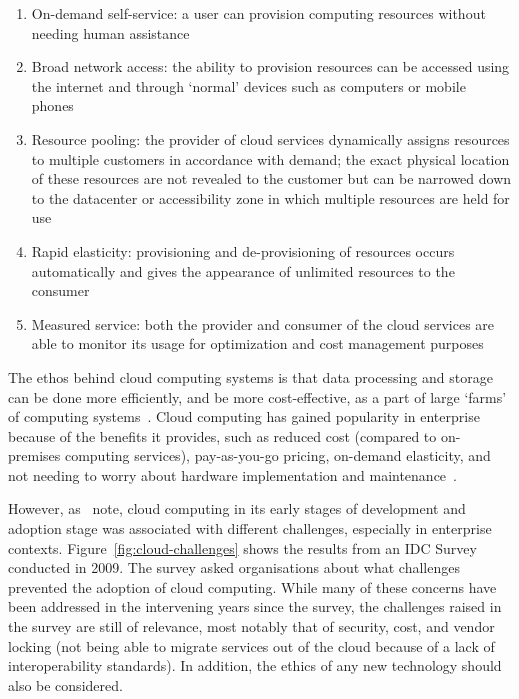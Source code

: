\begin{enumerate}
    \item On-demand self-service: a user can provision computing resources without needing human assistance
    \item Broad network access: the ability to provision resources can be accessed using the internet and through `normal' devices such as computers or mobile phones
    \item Resource pooling: the provider of cloud services dynamically assigns resources to multiple customers in accordance with demand; the exact physical location of these resources are not revealed to the customer but can be narrowed down to the datacenter or accessibility zone in which multiple resources are held for use
    \item Rapid elasticity: provisioning and de-provisioning of resources occurs automatically and gives the appearance of unlimited resources to the consumer
    \item Measured service: both the provider and consumer of the cloud services are able to monitor its usage for optimization and cost management purposes
\end{enumerate}

The ethos behind cloud computing systems is that data processing and storage can be done more efficiently, and be more cost-effective, as a part of large `farms' of computing systems~\citep{marinescu-cloud}.
Cloud computing has gained popularity in enterprise because of the benefits it provides,
such as reduced cost (compared to on-premises computing services), pay-as-you-go pricing, on-demand elasticity,
and not needing to worry about hardware implementation and maintenance~\citep{kumar-cloud}.

However, as~\citet{cc_challenges} note,
cloud computing in its early stages of development and adoption stage was associated with different challenges,
 especially in enterprise contexts.
Figure~\ref{fig:cloud-challenges} shows the results from an IDC Survey conducted in 2009.
The survey asked organisations about what challenges prevented the adoption of cloud computing.
While many of these concerns have been addressed in the intervening years since the survey,
the challenges raised in the survey are still of relevance, most notably that of security, cost, and vendor locking
(not being able to migrate services out of the cloud because of a lack of interoperability standards).
In addition, the ethics of any new technology should also be considered.

